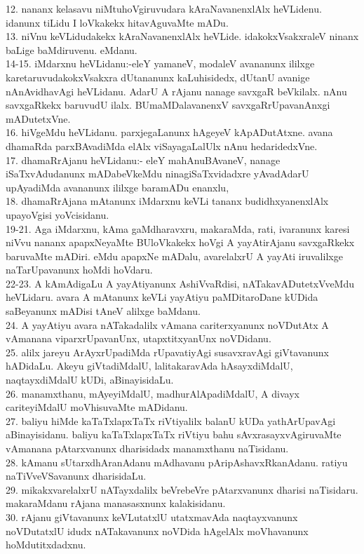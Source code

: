 \documentclass{article}
\begin{document}
12. nananx kelasavu niMtuhoVgiruvudara kAraNavanenxlAlx heVLidenu. idanunx tiLidu I loVkakekx hitavAguvaMte mADu.\\
13. niVnu keVLidudakekx kAraNavanenxlAlx heVLide. idakokxVsakxraleV ninanx baLige baMdiruvenu. eMdanu.\\
14-15. iMdarxnu heVLidanu:-eleY yamaneV, modaleV avananunx ililxge karetaruvudakokxVsakxra dUtananunx kaLuhisidedx, dUtanU avanige nAnAvidhavAgi heVLidanu. AdarU A rAjanu nanage savxgaR beVkilalx. nAnu savxgaRkekx baruvudU ilalx. BUmaMDalavanenxV savxgaRrUpavanAnxgi mADutetxVne.\\
16. hiVgeMdu heVLidanu. parxjegaLanunx hAgeyeV kApADutAtxne. avana dhamaRda parxBAvadiMda elAlx viSayagaLalUlx nAnu hedaridedxVne.\\
17. dhamaRrAjanu heVLidanu:- eleY mahAnuBAvaneV, nanage iSaTxvAdudanunx mADabeVkeMdu ninagiSaTxvidadxre yAvadAdarU upAyadiMda avananunx ililxge baramADu enanxlu,\\
18. dhamaRrAjana mAtanunx iMdarxnu keVLi tananx budidhxyanenxlAlx upayoVgisi yoVcisidanu.\\
19-21. Aga iMdarxnu, kAma gaMdharavxru, makaraMda, rati, ivaranunx karesi niVvu nananx apapxNeyaMte BUloVkakekx hoVgi A yayAtirAjanu savxgaRkekx baruvaMte mADiri. eMdu apapxNe mADalu, avarelalxrU A yayAti iruvalilxge naTarUpavanunx hoMdi hoVdaru.\\
22-23. A kAmAdigaLu A yayAtiyanunx AshiVvaRdisi, nATakavADutetxVveMdu heVLidaru. avara A mAtanunx keVLi yayAtiyu paMDitaroDane kUDida saBeyanunx mADisi tAneV alilxge baMdanu.\\
24. A yayAtiyu avara nATakadalilx vAmana cariterxyanunx noVDutAtx A vAmanana viparxrUpavanUnx, utapxtitxyanUnx noVDidanu.\\
25. alilx jareyu ArAyxrUpadiMda rUpavatiyAgi susavxravAgi giVtavanunx hADidaLu. Akeyu giVtadiMdalU, lalitakaravAda hAsayxdiMdalU, naqtayxdiMdalU kUDi, aBinayisidaLu.\\
26. manamxthanu, mAyeyiMdalU, madhurAlApadiMdalU, A divayx cariteyiMdalU moVhisuvaMte mADidanu.\\
27. baliyu hiMde kaTaTxlapxTaTx riVtiyalilx balanU kUDa yathArUpavAgi aBinayisidanu. baliyu kaTaTxlapxTaTx riVtiyu bahu sAvxrasayxvAgiruvaMte vAmanana pAtarxvanunx dharisidadx manamxthanu naTisidanu.\\
28. kAmanu sUtarxdhAranAdanu mAdhavanu pAripAshavxRkanAdanu. ratiyu naTiVveVSavanunx dharisidaLu.\\
29. mikakxvarelalxrU nATayxdalilx beVrebeVre pAtarxvanunx dharisi naTisidaru. makaraMdanu rAjana manasasxnunx kalakisidanu.\\
30. rAjanu giVtavanunx keVLutatxlU utatxmavAda naqtayxvanunx noVDutatxlU idudx nATakavanunx noVDida hAgelAlx moVhavanunx hoMdutitxdadxnu.\\
\end{document}
